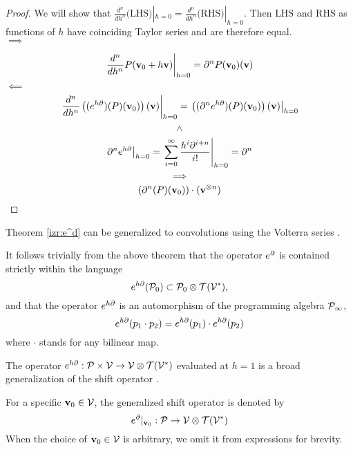  \begin{proof}
We will show that $\frac{d^n}{dh^n}\text{(LHS)}|_{h=0}=\frac{d^n}{dh^n}\text{(RHS)}|_{h=0}$. Then $\text{LHS}$ and $\text{RHS}$ as functions
of $h$ have coinciding Taylor series and are therefore equal.\\
 $\implies$
 
 $$\left. \frac{d^n}{dh^n}P(\mathbf{v}_0+h\mathbf{v})\right|_{h=0}=\partial^n P(\mathbf{v}_0)(\mathbf{v})$$
 $\impliedby$
 $$\left. \frac{d^n}{dh^n}\left((e^{h\partial})(P)(\mathbf{v}_0)\right)(\mathbf{v})\right|_{h=0}=
\left. \left((\partial^n e^{h\partial})(P)(\mathbf{v}_0)\right)(\mathbf{v})\right|_{h=0}$$
 $$\land$$
 $$\left. \partial^ne^{h\partial}\right| _{h=0}=\left. \sum\limits_{i=0}^{\infty}\frac{h^i\partial^{i+n}}{i!}\right|_{h=0}=\partial^n$$
 $$\implies$$
 $$\left(\partial^n(P)(\mathbf{v}_0)\right)\cdot(\mathbf{v}^{\otimes n})$$
 \end{proof}
 \begin{remark}\label{konvVrst}
 Theorem \ref{izr:e^d} can be generalized to convolutions using the Volterra series \cite{volterra}.
 \end{remark}
It follows trivially from the above theorem that the operator $e^\partial$ is contained strictly within the language
\begin{equation}
  e^{h\partial}(\mathcal{P}_0)\subset\mathcal{P}_0\otimes \mathcal{T}(\mathcal{V}^*),
\end{equation}
 and that the operator $e^{h\partial}$ is an automorphism of the programming algebra $\mathcal{P}_\infty$, 
\begin{equation}\label{eq:prod}
  e^{h\partial}(p_1\cdot p_2)=e^{h\partial}(p_1)\cdot e^{h\partial}(p_2)
 \end{equation}
 where $\cdot$ stands for any bilinear map. 
 \begin{remark}\label{rmrk:genShift}
 The operator $e^{h\partial}:\mathcal{P}\times \mathcal{V}\to \mathcal{V}\otimes \mathcal{T}(\mathcal{V}^*)$ evaluated at $h=1$
 is a broad generalization of the shift operator \cite{OpCalc}.
 \end{remark}
 
 For a specific $\mathbf{v}_0\in\mathcal{V}$, the generalized shift operator is denoted by
 \begin{equation*}
 e^\partial\vert_{\mathbf{v}_0}:\mathcal{P}\to \mathcal{V}\otimes \mathcal{T}(\mathcal{V}^*)
 \end{equation*}
 When the choice of $\mathbf{v}_0\in\mathcal{V}$ is arbitrary, we omit it from expressions for brevity.


